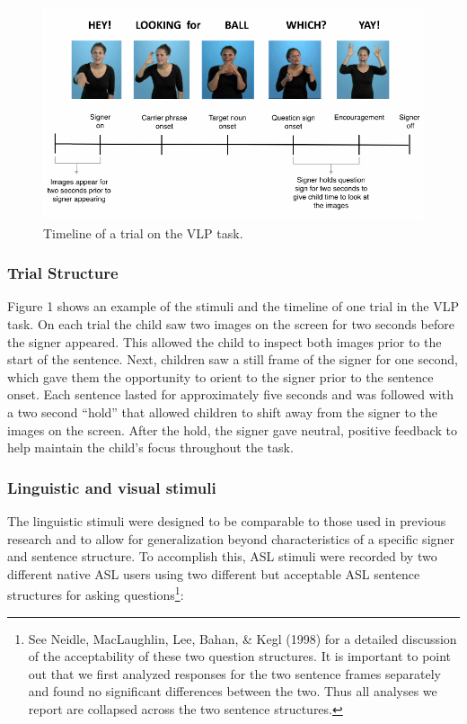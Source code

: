 \documentclass[12pt,]{article}
\let\rmarkdownfootnote\footnote%
\def\footnote{\protect\rmarkdownfootnote}
\begin{document}
\begin{figure}[htbp]
\centering
\includegraphics{Figs/timeline-1.pdf}
\caption{Timeline of a trial on the VLP task.}
\end{figure}

\subsubsection{Trial Structure}\label{trial-structure}

Figure 1 shows an example of the stimuli and the timeline of one trial
in the VLP task. On each trial the child saw two images on the screen
for two seconds before the signer appeared. This allowed the child to
inspect both images prior to the start of the sentence. Next, children
saw a still frame of the signer for one second, which gave them the
opportunity to orient to the signer prior to the sentence onset. Each
sentence lasted for approximately five seconds and was followed with a
two second ``hold'' that allowed children to shift away from the signer
to the images on the screen. After the hold, the signer gave neutral,
positive feedback to help maintain the child's focus throughout the
task.

\subsubsection{Linguistic and visual
stimuli}\label{linguistic-and-visual-stimuli}

The linguistic stimuli were designed to be comparable to those used in
previous research and to allow for generalization beyond characteristics
of a specific signer and sentence structure. To accomplish this, ASL
stimuli were recorded by two different native ASL users using two
different but acceptable ASL sentence structures for asking
questions\footnote{See Neidle, MacLaughlin, Lee, Bahan, \& Kegl (1998)
  for a detailed discussion of the acceptability of these two question
  structures. It is important to point out that we first analyzed
  responses for the two sentence frames separately and found no
  significant differences between the two. Thus all analyses we report
  are collapsed across the two sentence structures.}:
\end{document}
